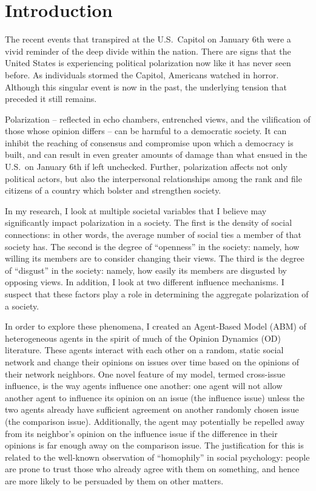 \section{Introduction}

The recent events that transpired at the U.S.~Capitol on January 6th were a
vivid reminder of the deep divide within the nation. There are signs that the
United States is experiencing political polarization now like it has never seen
before. As individuals stormed the Capitol, Americans watched in horror.
Although this singular event is now in the past, the underlying tension that
preceded it still remains.

Polarization -- reflected in echo chambers, entrenched views, and the
vilification of those whose opinion differs -- can be harmful to a democratic
society. It can inhibit the reaching of consensus and compromise upon which a
democracy is built, and can result in even greater amounts of damage than what
ensued in the U.S.~on January 6th if left unchecked. Further, polarization
affects not only political actors, but also the interpersonal relationships
among the rank and file citizens of a country which bolster and strengthen
society.

In my research, I look at multiple societal variables that I believe may
significantly impact polarization in a society. The first is the density of
social connections: in other words, the average number of social ties a member
of that society has. The second is the degree of ``openness'' in the society:
namely, how willing its members are to consider changing their views. The third is the degree of ``disgust'' in the society: namely, how easily its members are disgusted by opposing views. In addition, I look at two different influence mechanisms. I suspect that these factors play a role in determining the aggregate
polarization of a society.

In order to explore these phenomena, I created an Agent-Based Model (ABM) of
heterogeneous agents in the spirit of much of the Opinion Dynamics (OD)
literature. These agents interact with each other on a random, static social
network and change their opinions on issues over time based on the opinions of
their network neighbors. One novel feature of my model, termed cross-issue influence,
is the way agents influence one another: one agent will not allow another agent to influence its
opinion on an issue (the influence issue) unless the two agents already have sufficient agreement on
another randomly chosen issue (the comparison issue). Additionally, the agent may potentially be repelled away from its neighbor's opinion on the influence issue if the difference in their opinions is far enough away on the comparison issue. The justification for this is related to the
well-known observation of ``homophily'' in social psychology: people are prone
to trust those who already agree with them on something, and hence are more
likely to be persuaded by them on other matters.

